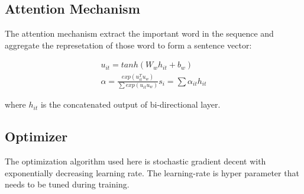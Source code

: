 \documentclass{article}
\begin{document}
\subsection{Attention Mechanism}
The attention mechanism extract the important word in the sequence and aggregate the represetation of those word to form a sentence vector:

\begin{align}
        u_{it} = tanh(W_w h_{it} + b_w) \\
        \alpha = \frac{exp(u_{it}^T u_w)}{\sum exp(u_{it} u_w)}
        s_i = \sum \alpha_{it} h_{it}
\end{align}

where $h_{it}$ is the concatenated output of bi-directional layer.

\subsection{Optimizer}
The optimization algorithm used here is stochastic gradient decent with exponentially decreasing learning rate. The learning-rate is hyper parameter that needs to be tuned during training. 




\end{document}
